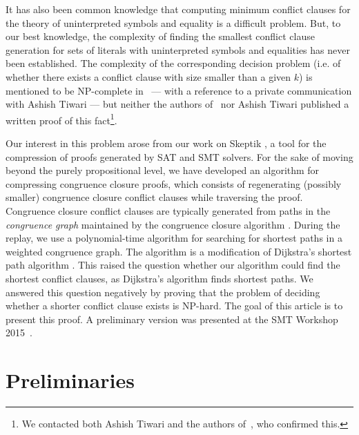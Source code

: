 \documentclass[smallextended]{svjour3}
\begin{document}
It has also been common knowledge that computing minimum conflict clauses for
the theory of uninterpreted symbols and equality is a difficult problem.  But,
to our best knowledge, the complexity of finding the smallest conflict clause generation
for sets of literals with uninterpreted symbols and equalities has never been
established.  The complexity of the corresponding decision problem (i.e. of whether there exists a conflict clause with size smaller than a given $k$) is mentioned to be NP-complete in~\cite{Nieuwenhuis6} --- with
a reference to a private communication with Ashish Tiwari --- but neither the
authors of~\cite{Nieuwenhuis6} nor Ashish Tiwari published a written proof of
this fact\footnote{We contacted both Ashish Tiwari and the authors
  of~\cite{Nieuwenhuis6}, who confirmed this.}.

Our interest in this problem arose from our work on Skeptik \cite{Boudou1}, a tool for the compression of proofs generated by SAT and SMT solvers. For the sake of moving beyond the purely propositional level, we have developed an algorithm for compressing congruence closure proofs, which consists of regenerating (possibly smaller) congruence closure conflict clauses while traversing the proof. Congruence closure conflict clauses are typically generated from paths in the \emph{congruence graph} maintained by the congruence closure algorithm \cite{Fontaine2004,Nieuwenhuis6,Nieuwenhuis9}. During the replay, we use a polynomial-time algorithm for searching for shortest paths in a weighted congruence graph. The algorithm is a modification of Dijkstra's shortest path algorithm \cite{Dijkstra1959}. This raised the question whether our algorithm could find the shortest conflict clauses, as Dijkstra's algorithm finds shortest paths. We answered this question negatively by proving that the problem of deciding whether a shorter conflict clause exists is NP-hard. The goal of this article is to present this proof.
A preliminary version was presented at the SMT Workshop 2015~\cite{Fellner1}.

\section{Preliminaries}
\end{document}

